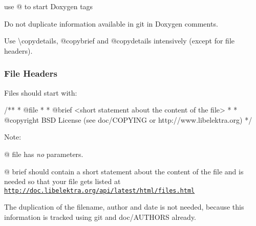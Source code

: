 \begin{DoxyItemize}
\item use {\ttfamily @} to start Doxygen tags
\item Do not duplicate information available in git in Doxygen comments.
\item Use {\ttfamily \textbackslash{}copydetails}, {\ttfamily @copybrief} and {\ttfamily @copydetails} intensively (except for file headers).
\end{DoxyItemize}

\subsubsection*{File Headers}

Files should start with\+:

\begin{DoxyVerb}        /**
         * @file
         *
         * @brief <short statement about the content of the file>
         *
         * @copyright BSD License (see doc/COPYING or http://www.libelektra.org)
         */\end{DoxyVerb}


Note\+:


\begin{DoxyItemize}
\item {\ttfamily @} {\ttfamily file} has {\itshape no} parameters.
\item {\ttfamily @} {\ttfamily brief} should contain a short statement about the content of the file and is needed so that your file gets listed at \href{http://doc.libelektra.org/api/latest/html/files.html}{\tt http\+://doc.\+libelektra.\+org/api/latest/html/files.\+html}
\end{DoxyItemize}

The duplication of the filename, author and date is not needed, because this information is tracked using git and doc/\+A\+U\+T\+H\+O\+R\+S already. 